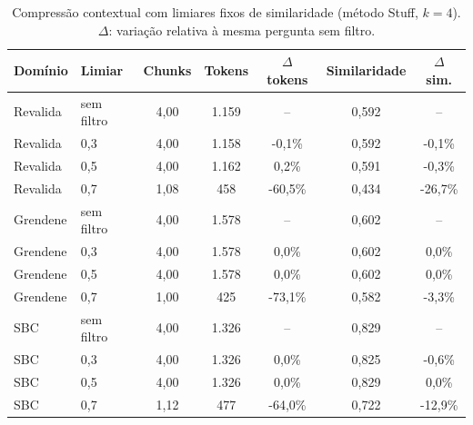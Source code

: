 \begin{table}[!t]
\centering
\footnotesize
\setlength{\tabcolsep}{4pt}
\caption{Compressão contextual com limiares fixos de similaridade (método Stuff, $k = 4$). $\Delta$: variação relativa à mesma pergunta sem filtro.}
\label{tab:compressao_fixa}
\begin{tabular}{llccccc}
\toprule
Domínio & Limiar & Chunks & Tokens & $\Delta$ tokens & Similaridade & $\Delta$ sim. \\
\midrule
Revalida & sem filtro & 4,00 & 1.159 & -- & 0,592 & -- \\
Revalida & 0,3 & 4,00 & 1.158 & -0,1\% & 0,592 & -0,1\% \\
Revalida & 0,5 & 4,00 & 1.162 & 0,2\% & 0,591 & -0,3\% \\
Revalida & 0,7 & 1,08 & 458 & -60,5\% & 0,434 & -26,7\% \\
Grendene & sem filtro & 4,00 & 1.578 & -- & 0,602 & -- \\
Grendene & 0,3 & 4,00 & 1.578 & 0,0\% & 0,602 & 0,0\% \\
Grendene & 0,5 & 4,00 & 1.578 & 0,0\% & 0,602 & 0,0\% \\
Grendene & 0,7 & 1,00 & 425 & -73,1\% & 0,582 & -3,3\% \\
SBC & sem filtro & 4,00 & 1.326 & -- & 0,829 & -- \\
SBC & 0,3 & 4,00 & 1.326 & 0,0\% & 0,825 & -0,6\% \\
SBC & 0,5 & 4,00 & 1.326 & 0,0\% & 0,829 & 0,0\% \\
SBC & 0,7 & 1,12 & 477 & -64,0\% & 0,722 & -12,9\% \\
\bottomrule
\end{tabular}
\end{table}
